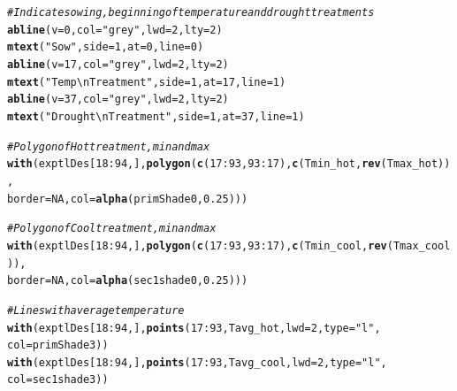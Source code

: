 \documentclass[11pt, oneside]{article}\usepackage[]{graphicx}\usepackage[]{color}
\makeatletter
\newcommand{\hlnum}[1]{\textcolor[rgb]{0.686,0.059,0.569}{#1}}%
\newcommand{\hlstr}[1]{\textcolor[rgb]{0.192,0.494,0.8}{#1}}%
\newcommand{\hlcom}[1]{\textcolor[rgb]{0.678,0.584,0.686}{\textit{#1}}}%
\newcommand{\hlopt}[1]{\textcolor[rgb]{0,0,0}{#1}}%
\newcommand{\hlstd}[1]{\textcolor[rgb]{0.345,0.345,0.345}{#1}}%
\newcommand{\hlkwc}[1]{\textcolor[rgb]{0.333,0.667,0.333}{#1}}%
\newcommand{\hlkwd}[1]{\textcolor[rgb]{0.737,0.353,0.396}{\textbf{#1}}}%
\newenvironment{kframe}{%
 \def\at@end@of@kframe{}%
 \ifinner\ifhmode%
  \def\at@end@of@kframe{\end{minipage}}%
  \begin{minipage}{\columnwidth}%
 \fi\fi%
 \def\FrameCommand##1{\hskip\@totalleftmargin \hskip-\fboxsep
 \colorbox{shadecolor}{##1}\hskip-\fboxsep
     \hskip-\linewidth \hskip-\@totalleftmargin \hskip\columnwidth}%
 \MakeFramed {\advance\hsize-\width
   \@totalleftmargin\z@ \linewidth\hsize
   \@setminipage}}%
 {\par\unskip\endMakeFramed%
 \at@end@of@kframe}
\newenvironment{knitrout}{}{} %
\makeatother
\begin{document}
\begin{knitrout}
\begin{kframe}
\begin{alltt}
\hlcom{# Indicate sowing, beginning of temperature and drought treatments}
\hlkwd{abline}\hlstd{(}\hlkwc{v} \hlstd{=} \hlnum{0}\hlstd{,} \hlkwc{col} \hlstd{=} \hlstr{"grey"}\hlstd{,} \hlkwc{lwd} \hlstd{=} \hlnum{2}\hlstd{,} \hlkwc{lty} \hlstd{=} \hlnum{2}\hlstd{)}
\hlkwd{mtext}\hlstd{(}\hlstr{"Sow"}\hlstd{,} \hlkwc{side} \hlstd{=} \hlnum{1}\hlstd{,} \hlkwc{at} \hlstd{=} \hlnum{0}\hlstd{,} \hlkwc{line} \hlstd{=} \hlnum{0}\hlstd{)}
\hlkwd{abline}\hlstd{(}\hlkwc{v} \hlstd{=} \hlnum{17}\hlstd{,} \hlkwc{col} \hlstd{=} \hlstr{"grey"}\hlstd{,} \hlkwc{lwd} \hlstd{=} \hlnum{2}\hlstd{,} \hlkwc{lty} \hlstd{=} \hlnum{2}\hlstd{)}
\hlkwd{mtext}\hlstd{(}\hlstr{"Temp\textbackslash{}nTreatment"}\hlstd{,} \hlkwc{side} \hlstd{=} \hlnum{1}\hlstd{,} \hlkwc{at} \hlstd{=} \hlnum{17}\hlstd{,} \hlkwc{line} \hlstd{=} \hlnum{1}\hlstd{)}
\hlkwd{abline}\hlstd{(}\hlkwc{v} \hlstd{=} \hlnum{37}\hlstd{,} \hlkwc{col} \hlstd{=} \hlstr{"grey"}\hlstd{,} \hlkwc{lwd} \hlstd{=} \hlnum{2}\hlstd{,} \hlkwc{lty} \hlstd{=} \hlnum{2}\hlstd{)}
\hlkwd{mtext}\hlstd{(}\hlstr{"Drought\textbackslash{}nTreatment"}\hlstd{,} \hlkwc{side} \hlstd{=} \hlnum{1}\hlstd{,} \hlkwc{at} \hlstd{=} \hlnum{37}\hlstd{,} \hlkwc{line} \hlstd{=} \hlnum{1}\hlstd{)}

\hlcom{# Polygon of Hot treatment, min and max}
\hlkwd{with}\hlstd{(exptlDes[}\hlnum{18}\hlopt{:}\hlnum{94}\hlstd{, ],} \hlkwd{polygon}\hlstd{(}\hlkwd{c}\hlstd{(}\hlnum{17}\hlopt{:}\hlnum{93}\hlstd{,} \hlnum{93}\hlopt{:}\hlnum{17}\hlstd{),} \hlkwd{c}\hlstd{(Tmin_hot,} \hlkwd{rev}\hlstd{(Tmax_hot)),}
  \hlkwc{border} \hlstd{=} \hlnum{NA}\hlstd{,} \hlkwc{col} \hlstd{=} \hlkwd{alpha}\hlstd{(primShade0,} \hlnum{0.25}\hlstd{)))}

\hlcom{# Polygon of Cool treatment, min and max}
\hlkwd{with}\hlstd{(exptlDes[}\hlnum{18}\hlopt{:}\hlnum{94}\hlstd{, ],} \hlkwd{polygon}\hlstd{(}\hlkwd{c}\hlstd{(}\hlnum{17}\hlopt{:}\hlnum{93}\hlstd{,} \hlnum{93}\hlopt{:}\hlnum{17}\hlstd{),} \hlkwd{c}\hlstd{(Tmin_cool,} \hlkwd{rev}\hlstd{(Tmax_cool)),}
  \hlkwc{border} \hlstd{=} \hlnum{NA}\hlstd{,} \hlkwc{col} \hlstd{=} \hlkwd{alpha}\hlstd{(sec1shade0,} \hlnum{0.25}\hlstd{)))}

\hlcom{# Lines with average temperature}
\hlkwd{with}\hlstd{(exptlDes[}\hlnum{18}\hlopt{:}\hlnum{94}\hlstd{, ],} \hlkwd{points}\hlstd{(}\hlnum{17}\hlopt{:}\hlnum{93}\hlstd{, Tavg_hot,} \hlkwc{lwd} \hlstd{=} \hlnum{2}\hlstd{,} \hlkwc{type} \hlstd{=} \hlstr{"l"}\hlstd{,}
        \hlkwc{col} \hlstd{= primShade3))}
\hlkwd{with}\hlstd{(exptlDes[}\hlnum{18}\hlopt{:}\hlnum{94}\hlstd{, ],} \hlkwd{points}\hlstd{(}\hlnum{17}\hlopt{:}\hlnum{93}\hlstd{, Tavg_cool,} \hlkwc{lwd} \hlstd{=} \hlnum{2}\hlstd{,} \hlkwc{type} \hlstd{=} \hlstr{"l"}\hlstd{,}
        \hlkwc{col} \hlstd{= sec1shade3))}


\end{alltt}
\end{kframe}
\end{knitrout}
\end{document}
